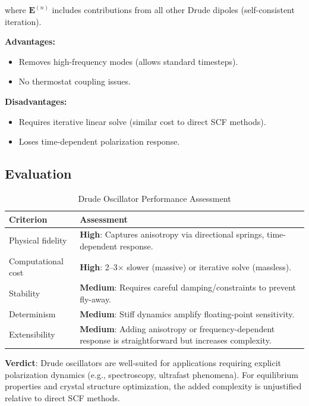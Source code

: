 \documentclass[11pt,letterpaper]{article}
\newcommand{\vE}{\mathbf{E}}
\begin{document}
where $\vE^{(n)}$ includes contributions from all other Drude dipoles (self-consistent iteration).

\textbf{Advantages:}
\begin{itemize}
    \item Removes high-frequency modes (allows standard timesteps).
    \item No thermostat coupling issues.
\end{itemize}

\textbf{Disadvantages:}
\begin{itemize}
    \item Requires iterative linear solve (similar cost to direct SCF methods).
    \item Loses time-dependent polarization response.
\end{itemize}

\subsection{Evaluation}

\begin{table}[h]
\centering
\caption{Drude Oscillator Performance Assessment}
\label{tab:drude}
\begin{tabular}{@{}lp{10cm}@{}}
\toprule
\textbf{Criterion} & \textbf{Assessment} \\
\midrule
Physical fidelity & \textbf{High}: Captures anisotropy via directional springs, time-dependent response. \\
Computational cost & \textbf{High}: 2--3$\times$ slower (massive) or iterative solve (massless). \\
Stability & \textbf{Medium}: Requires careful damping/constraints to prevent fly-away. \\
Determinism & \textbf{Medium}: Stiff dynamics amplify floating-point sensitivity. \\
Extensibility & \textbf{Medium}: Adding anisotropy or frequency-dependent response is straightforward but increases complexity. \\
\bottomrule
\end{tabular}
\end{table}

\textbf{Verdict}: Drude oscillators are well-suited for applications requiring explicit polarization dynamics (e.g., spectroscopy, ultrafast phenomena). For equilibrium properties and crystal structure optimization, the added complexity is unjustified relative to direct SCF methods.
\end{document}
